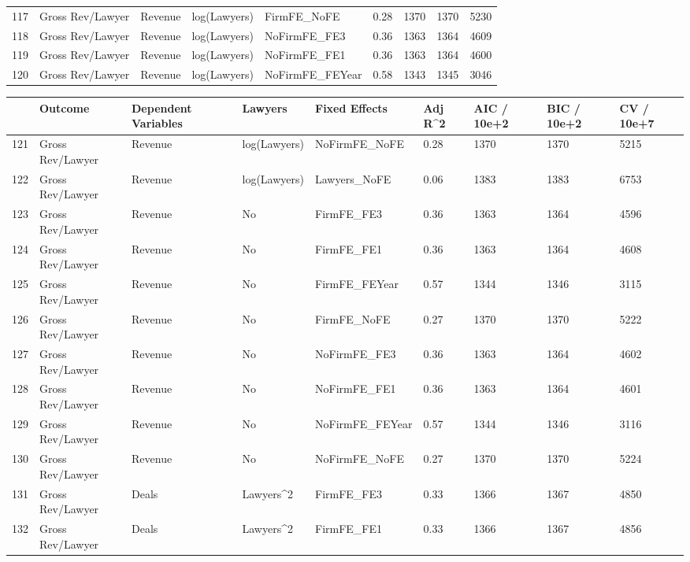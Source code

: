 \documentclass{article}
\begin{document}
\begin{table}[H]
\begin{tabular}{rllllllll}
  117 & Gross Rev/Lawyer & Revenue & log(Lawyers) & FirmFE\_NoFE & 0.28 & 1370 & 1370 & 5230 \\ 
  118 & Gross Rev/Lawyer & Revenue & log(Lawyers) & NoFirmFE\_FE3 & 0.36 & 1363 & 1364 & 4609 \\ 
  119 & Gross Rev/Lawyer & Revenue & log(Lawyers) & NoFirmFE\_FE1 & 0.36 & 1363 & 1364 & 4600 \\ 
  120 & Gross Rev/Lawyer & Revenue & log(Lawyers) & NoFirmFE\_FEYear & 0.58 & 1343 & 1345 & 3046 \\ 
   \hline
\end{tabular}
\end{table}
\begin{table}[H]
\centering
\begin{tabular}{rllllllll}
  \hline
 & Outcome & Dependent Variables & Lawyers & Fixed Effects & Adj R^2 & AIC / 10e+2 & BIC / 10e+2 & CV / 10e+7 \\ 
  \hline
121 & Gross Rev/Lawyer & Revenue & log(Lawyers) & NoFirmFE\_NoFE & 0.28 & 1370 & 1370 & 5215 \\ 
  122 & Gross Rev/Lawyer & Revenue & log(Lawyers) & Lawyers\_NoFE & 0.06 & 1383 & 1383 & 6753 \\ 
  123 & Gross Rev/Lawyer & Revenue & No & FirmFE\_FE3 & 0.36 & 1363 & 1364 & 4596 \\ 
  124 & Gross Rev/Lawyer & Revenue & No & FirmFE\_FE1 & 0.36 & 1363 & 1364 & 4608 \\ 
  125 & Gross Rev/Lawyer & Revenue & No & FirmFE\_FEYear & 0.57 & 1344 & 1346 & 3115 \\ 
  126 & Gross Rev/Lawyer & Revenue & No & FirmFE\_NoFE & 0.27 & 1370 & 1370 & 5222 \\ 
  127 & Gross Rev/Lawyer & Revenue & No & NoFirmFE\_FE3 & 0.36 & 1363 & 1364 & 4602 \\ 
  128 & Gross Rev/Lawyer & Revenue & No & NoFirmFE\_FE1 & 0.36 & 1363 & 1364 & 4601 \\ 
  129 & Gross Rev/Lawyer & Revenue & No & NoFirmFE\_FEYear & 0.57 & 1344 & 1346 & 3116 \\ 
  130 & Gross Rev/Lawyer & Revenue & No & NoFirmFE\_NoFE & 0.27 & 1370 & 1370 & 5224 \\ 
  131 & Gross Rev/Lawyer & Deals & Lawyers^2 & FirmFE\_FE3 & 0.33 & 1366 & 1367 & 4850 \\ 
  132 & Gross Rev/Lawyer & Deals & Lawyers^2 & FirmFE\_FE1 & 0.33 & 1366 & 1367 & 4856 \\ 

\end{tabular}
\end{table}
\end{document}
